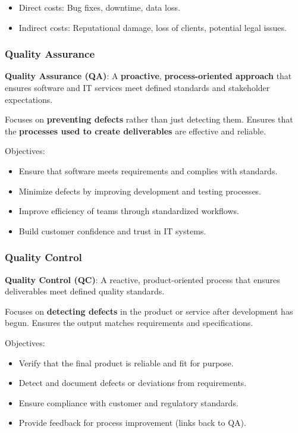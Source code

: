 \begin{itemize}
    \item Direct costs: Bug fixes, downtime, data loss.
    \item Indirect costs: Reputational damage, loss of clients, potential legal issues.
\end{itemize}

\subsubsection{Quality Assurance}

\indent 

\textbf{Quality Assurance (QA)}: A \textbf{proactive}, \textbf{process-oriented approach} that ensures software and IT services meet defined standards and stakeholder expectations.

Focuses on \textbf{preventing defects} rather than just detecting them. Ensures that the \textbf{processes used to create deliverables} are effective and reliable.

\bigskip

\noindent Objectives:

\begin{itemize}
    \item Ensure that software meets requirements and complies with standards.
    \item Minimize defects by improving development and testing processes.
    \item Improve efficiency of teams through standardized workflows.
    \item Build customer confidence and trust in IT systems.
\end{itemize}

\subsubsection{Quality Control}

\indent 

\textbf{Quality Control (QC)}: A reactive, product-oriented process that ensures deliverables meet defined quality standards.

Focuses on \textbf{detecting defects} in the product or service after development has begun. Ensures the output matches requirements and specifications.

\bigskip

\noindent Objectives:

\begin{itemize}
    \item Verify that the final product is reliable and fit for purpose.
    \item Detect and document defects or deviations from requirements.
    \item Ensure compliance with customer and regulatory standards.
    \item Provide feedback for process improvement (links back to QA).
\end{itemize}

